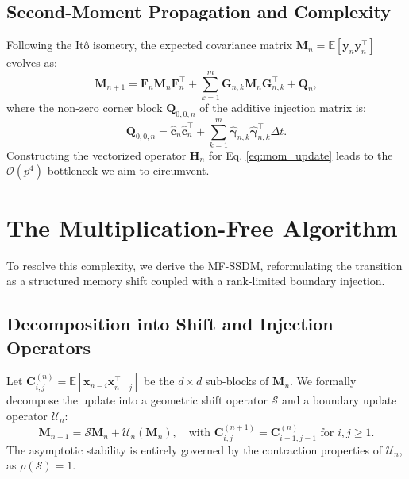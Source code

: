 \documentclass[preprint,12pt]{elsarticle}
\begin{document}
\subsection{Second-Moment Propagation and Complexity}
Following the It\^o isometry, the expected covariance matrix $\mathbf{M}_n = \mathbb{E}[\mathbf{y}_n \mathbf{y}_n^\top]$ evolves as:
\begin{equation}
\label{eq:mom_update}
\mathbf{M}_{n+1} = \mathbf{F}_n \mathbf{M}_n \mathbf{F}_n^\top + \sum_{k=1}^m \mathbf{G}_{n,k} \mathbf{M}_n \mathbf{G}_{n,k}^\top + \mathbf{Q}_n,
\end{equation}
where the non-zero corner block $\mathbf{Q}_{0,0,n}$ of the additive injection matrix is:
\begin{equation}
\mathbf{Q}_{0,0,n} = \hat{\mathbf{c}}_n \hat{\mathbf{c}}_n^\top + \sum_{k=1}^m \hat{\boldsymbol{\gamma}}_{n,k} \hat{\boldsymbol{\gamma}}_{n,k}^\top \Delta t.
\end{equation}
Constructing the vectorized operator $\mathbf{H}_n$ for Eq. \eqref{eq:mom_update} leads to the $\mathcal{O}(p^4)$ bottleneck we aim to circumvent.

\section{The Multiplication-Free Algorithm}
\label{sec:mf_algo}

To resolve this complexity, we derive the MF-SSDM, reformulating the transition as a structured memory shift coupled with a rank-limited boundary injection.

\subsection{Decomposition into Shift and Injection Operators}
Let $\mathbf{C}_{i,j}^{(n)} = \mathbb{E}[\mathbf{x}_{n-i} \mathbf{x}_{n-j}^\top]$ be the $d \times d$ sub-blocks of $\mathbf{M}_n$. We formally decompose the update into a geometric shift operator $\mathcal{S}$ and a boundary update operator $\mathcal{U}_n$:
\begin{equation}
\mathbf{M}_{n+1} = \mathcal{S} \mathbf{M}_n + \mathcal{U}_n(\mathbf{M}_n), \quad \text{with } \mathbf{C}_{i,j}^{(n+1)} = \mathbf{C}_{i-1,j-1}^{(n)} \text{ for } i,j \ge 1.
\end{equation}
The asymptotic stability is entirely governed by the contraction properties of $\mathcal{U}_n$, as $\rho(\mathcal{S}) = 1$.
\end{document}

